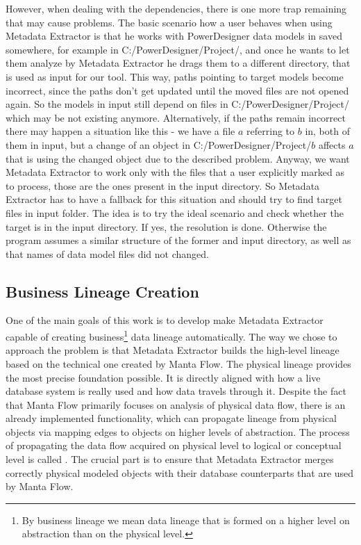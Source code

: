 However, when dealing with the dependencies, there is one more trap remaining that may cause problems. The basic scenario how a user behaves when using Metadata Extractor is that he works with PowerDesigner data models in saved somewhere, for example in C:/PowerDesigner/Project/, and once he wants to let them analyze by Metadata Extractor he drags them to a different directory, that is used as input for our tool.
This way, paths pointing to target models become incorrect, since the paths don't get updated until the moved files are not opened again. 
So the models in input still depend on files in C:/PowerDesigner/Project/ which may be not existing anymore. Alternatively, if the paths remain incorrect there may happen a situation like this - we have a file $a$ referring to $b$ in, both of them in input, but a change of an object in C:/PowerDesigner/Project/$b$ affects $a$ that is using the changed object due to the described problem.
Anyway, we want Metadata Extractor to work only with the files that a user explicitly marked as to process, those are the ones present in the input directory.
So Metadata Extractor has to have a fallback for this situation and should try to find target files in input folder.
The idea is to try the ideal scenario and check whether the target is in the input directory. If yes, the resolution is done.
Otherwise the program assumes a similar structure of the former and input directory, as well as that names of data model files did not changed.

\subsection{Business Lineage Creation}

One of the main goals of this work is to develop make Metadata Extractor capable of creating business\footnote{By business lineage we mean data lineage that is formed on a higher level on abstraction than on the physical level.} data lineage automatically.
The way we chose to approach the problem is that Metadata Extractor builds the high-level lineage based on the technical one created by Manta Flow. 
The physical lineage provides the most precise foundation possible. 
It is directly aligned with how a live database system is really used and how data travels through it.
Despite the fact that Manta Flow primarily focuses on analysis of physical data flow, there is an already implemented functionality, which can propagate lineage from physical objects via mapping edges to objects on higher levels of abstraction.
The process of propagating the data flow acquired on physical level to logical or conceptual level is called .
The crucial part is to ensure that Metadata Extractor merges correctly physical modeled objects with their database counterparts that are used by Manta Flow.

